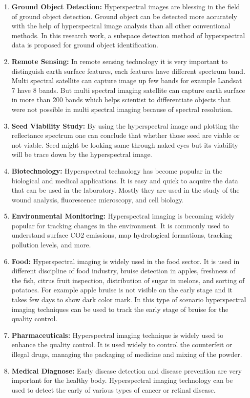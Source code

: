 \documentclass[document.tex]{subfiles}
\begin{document}
\begin{enumerate}
	\item \textbf{Ground Object Detection:} Hyperspectral images are blessing in the field of ground object detection. Ground object can be detected more accurately with the help of hyperspectral image analysis than all other conventional methods. In this research work, a subspace detection method of hyperspectral data is proposed for ground object identification.
	\item \textbf{Remote Sensing:} In remote sensing technology it is very important to distinguish earth surface features, each features have different spectrum band. Multi spectral satellite can capture image up few bands for example Landsat 7 have 8 bands. But multi spectral imaging satellite can capture earth surface in more than 200 bands which helps scientist to differentiate objects that were not possible in multi spectral imaging because of spectral resolution.
	\item \textbf{Seed Viability Study: }By using the hyperspectral image and plotting the reflectance spectrum one can conclude that whether those seed are viable or not viable. Seed might be looking same through naked eyes but its viability will be trace down by the hyperspectral image.
	\item \textbf{Biotechnology:} Hyperspectral technology has become popular in the biological and medical applications. It is easy and quick to acquire the data that can be used in the laboratory. Mostly they are used in the study of the wound analysis, fluorescence microscopy, and cell biology.
	\item \textbf{Environmental Monitoring:} Hyperspectral imaging is becoming widely popular for tracking changes in the environment. It is commonly used to understand surface CO2 emissions, map hydrological formations, tracking pollution levels, and more.
	\item \textbf{Food: }Hyperspectral imaging is widely used in the food sector. It is used in different discipline of food industry, bruise detection in apples, freshness of the fish, citrus fruit inspection, distribution of sugar in melons, and sorting of potatoes. For example apple bruise is not visible on the early stage and it takes few days to show dark color mark. In this type of scenario hyperspectral imaging techniques can be used to track the early stage of bruise for the quality control.
	\item \textbf{Pharmaceuticals: } Hyperspectral imaging technique is widely used to enhance the quality control. It is used widely to control the counterfeit or illegal drugs, managing the packaging of medicine and mixing of the powder.
	\item \textbf{Medical Diagnose: }Early disease detection and disease prevention are very important for the healthy body. Hyperspectral imaging technology can be used to detect the early of various types of cancer or retinal disease.
\end{enumerate}
\end{document}

